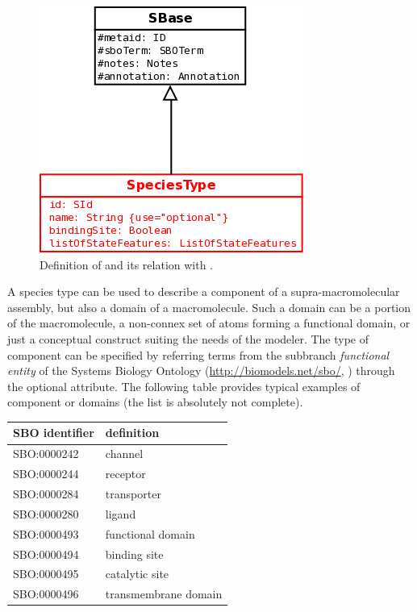 \begin{figure}[H]
\begin{center}
\includegraphics[scale=0.3]{figs/pngs/SpeciesTypeClass.png} 
\caption{Definition of  and its relation with .}
\label{fig:SpeciesTypeClass}
\end{center}
\end{figure}

A species type can be used to describe a component of a supra-macromolecular assembly, but also a domain of a macromolecule. Such a domain can be a portion of the macromolecule, a non-connex set of atoms forming a functional domain, or just a conceptual construct suiting the needs of the modeler. The type of component can be specified by referring terms from the subbranch \emph{functional entity} of the Systems Biology Ontology (\url{http://biomodels.net/sbo/}, \citep{Lenov:2007}) through the optional  attribute. The following table provides typical examples of component or domains (the list is absolutely not complete).\\

\begin{center}
\begin{tabular}{ll}
\hline
SBO identifier & definition \\
\hline
SBO:0000242 & channel \\
SBO:0000244 & receptor \\
SBO:0000284 & transporter \\
SBO:0000280 & ligand \\ 
SBO:0000493 & functional domain \\
SBO:0000494 & binding site \\
SBO:0000495 & catalytic site \\
SBO:0000496 & transmembrane domain \\
\hline
\end{tabular}\\[\baselineskip]
\end{center}

